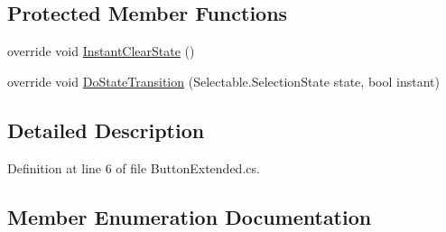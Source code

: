 \subsection*{Protected Member Functions}
\begin{DoxyCompactItemize}
\item 
override void \hyperlink{class_unity_engine_1_1_u_i_1_1_button_extended_a21ab381b694884fc15516eff18468013}{Instant\+Clear\+State} ()
\item 
override void \hyperlink{class_unity_engine_1_1_u_i_1_1_button_extended_a311d2d236b0c11a7af9b3cab97b6d4ec}{Do\+State\+Transition} (Selectable.\+Selection\+State state, bool instant)
\end{DoxyCompactItemize}


\subsection{Detailed Description}


Definition at line 6 of file Button\+Extended.\+cs.



\subsection{Member Enumeration Documentation}
\hypertarget{class_unity_engine_1_1_u_i_1_1_button_extended_a736f90926c9b164b76e47cefbabc0798}{}
